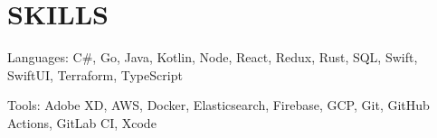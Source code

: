 \section{SKILLS}
\begin{bulletlist}
   \item{Languages: C\#, Go, Java, Kotlin, Node, React, Redux, Rust, SQL, Swift, SwiftUI, Terraform, TypeScript}
   \item{Tools: Adobe XD, AWS, Docker, Elasticsearch, Firebase, GCP, Git, GitHub Actions, GitLab CI, Xcode}
\end{bulletlist}
